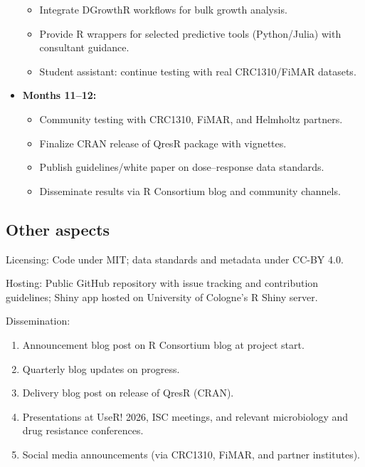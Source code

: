 \documentclass[
]{article}
\providecommand{\tightlist}{%
  \setlength{\itemsep}{0pt}\setlength{\parskip}{0pt}}
\begin{document}
\begin{itemize}
  \begin{itemize}
  \tightlist
  \item
    Integrate DGrowthR workflows for bulk growth analysis.
  \item
    Provide R wrappers for selected predictive tools (Python/Julia) with
    consultant guidance.
  \item
    Student assistant: continue testing with real CRC1310/FiMAR
    datasets.
  \end{itemize}
\item
  \textbf{Months 11--12:}

  \begin{itemize}
  \tightlist
  \item
    Community testing with CRC1310, FiMAR, and Helmholtz partners.
  \item
    Finalize CRAN release of QresR package with vignettes.
  \item
    Publish guidelines/white paper on dose--response data standards.
  \item
    Disseminate results via R Consortium blog and community channels.
  \end{itemize}
\end{itemize}

\subsection{Other aspects}\label{other-aspects}

Licensing: Code under MIT; data standards and metadata under CC-BY 4.0.

Hosting: Public GitHub repository with issue tracking and contribution
guidelines; Shiny app hosted on University of Cologne's R Shiny server.

Dissemination:

\begin{enumerate}
\def\labelenumi{\arabic{enumi}.}
\tightlist
\item
  Announcement blog post on R Consortium blog at project start.
\item
  Quarterly blog updates on progress.
\item
  Delivery blog post on release of QresR (CRAN).
\item
  Presentations at UseR! 2026, ISC meetings, and relevant microbiology
  and drug resistance conferences.
\item
  Social media announcements (via CRC1310, FiMAR, and partner
  institutes).
\end{enumerate}
\end{document}

